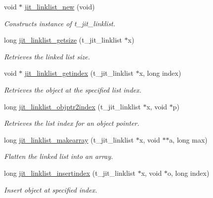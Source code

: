 \begin{DoxyCompactItemize}
\item 
void $\ast$ \hyperlink{group__linklistmod_gae31b06dd709cdaf1e035ad562bd5626f}{jit\_\-linklist\_\-new} (void)
\begin{DoxyCompactList}\small\item\em Constructs instance of t\_\-jit\_\-linklist. \item\end{DoxyCompactList}\item 
long \hyperlink{group__linklistmod_gaab0a8e1a6848d0d6713d703ebe7b9427}{jit\_\-linklist\_\-getsize} (t\_\-jit\_\-linklist $\ast$x)
\begin{DoxyCompactList}\small\item\em Retrieves the linked list size. \item\end{DoxyCompactList}\item 
void $\ast$ \hyperlink{group__linklistmod_ga727e60be2a2ff3426661dbac83119599}{jit\_\-linklist\_\-getindex} (t\_\-jit\_\-linklist $\ast$x, long index)
\begin{DoxyCompactList}\small\item\em Retrieves the object at the specified list index. \item\end{DoxyCompactList}\item 
long \hyperlink{group__linklistmod_ga2861d793a9f33c725e5d49946bb7e6bc}{jit\_\-linklist\_\-objptr2index} (t\_\-jit\_\-linklist $\ast$x, void $\ast$p)
\begin{DoxyCompactList}\small\item\em Retrieves the list index for an object pointer. \item\end{DoxyCompactList}\item 
long \hyperlink{group__linklistmod_ga46b1ab616dda1cd288c0ef2bcff09ae8}{jit\_\-linklist\_\-makearray} (t\_\-jit\_\-linklist $\ast$x, void $\ast$$\ast$a, long max)
\begin{DoxyCompactList}\small\item\em Flatten the linked list into an array. \item\end{DoxyCompactList}\item 
long \hyperlink{group__linklistmod_gabd11461161921960afdceb120d039a04}{jit\_\-linklist\_\-insertindex} (t\_\-jit\_\-linklist $\ast$x, void $\ast$o, long index)
\begin{DoxyCompactList}\small\item\em Insert object at specified index. \item\end{DoxyCompactList}\item 
$$
\end{DoxyCompactItemize}
